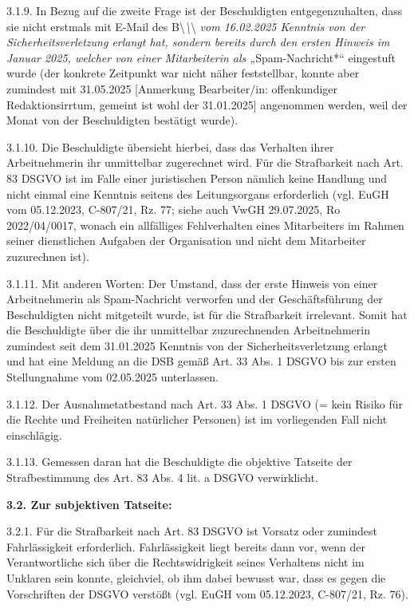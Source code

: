 \documentclass[11pt,a4paper]{article}
\begin{document}
3.1.9. In Bezug auf die zweite Frage ist der Beschuldigten entgegenzuhalten, dass sie nicht erstmals mit E-Mail des B\textbackslash{}\textit{\textbackslash{}}\textbackslash{}\textit{ vom 16.02.2025 Kenntnis von der Sicherheitsverletzung erlangt hat, sondern bereits durch den ersten Hinweis im Januar 2025, welcher von einer Mitarbeiterin als „}Spam-Nachricht*“ eingestuft wurde (der konkrete Zeitpunkt war nicht näher feststellbar, konnte aber zumindest mit 31.05.2025 [Anmerkung Bearbeiter/in: offenkundiger Redaktionsirrtum, gemeint ist wohl der 31.01.2025] angenommen werden, weil der Monat von der Beschuldigten bestätigt wurde).

3.1.10. Die Beschuldigte übersieht hierbei, dass das Verhalten ihrer Arbeitnehmerin ihr unmittelbar zugerechnet wird. Für die Strafbarkeit nach Art. 83 DSGVO ist im Falle einer juristischen Person nämlich keine Handlung und nicht einmal eine Kenntnis seitens des Leitungsorgans erforderlich (vgl. EuGH vom 05.12.2023, C-807/21, Rz. 77; siehe auch VwGH 29.07.2025, Ro 2022/04/0017, wonach ein allfälliges Fehlverhalten eines Mitarbeiters im Rahmen seiner dienstlichen Aufgaben der Organisation und nicht dem Mitarbeiter zuzurechnen ist).

3.1.11. Mit anderen Worten: Der Umstand, dass der erste Hinweis von einer Arbeitnehmerin als Spam-Nachricht verworfen und der Geschäftsführung der Beschuldigten nicht mitgeteilt wurde, ist für die Strafbarkeit irrelevant. Somit hat die Beschuldigte über die ihr unmittelbar zuzurechnenden Arbeitnehmerin zumindest seit dem 31.01.2025 Kenntnis von der Sicherheitsverletzung erlangt und hat eine Meldung an die DSB gemäß Art. 33 Abs. 1 DSGVO bis zur ersten Stellungnahme vom 02.05.2025 unterlassen.

3.1.12. Der Ausnahmetatbestand nach Art. 33 Abs. 1 DSGVO (= kein Risiko für die Rechte und Freiheiten natürlicher Personen) ist im vorliegenden Fall nicht einschlägig.

3.1.13. Gemessen daran hat die Beschuldigte die objektive Tatseite der Strafbestimmung des Art. 83 Abs. 4 lit. a DSGVO verwirklicht.

\textbf{3.2. Zur subjektiven Tatseite:}

3.2.1. Für die Strafbarkeit nach Art. 83 DSGVO ist Vorsatz oder zumindest Fahrlässigkeit erforderlich. Fahrlässigkeit liegt bereits dann vor, wenn der Verantwortliche sich über die Rechtswidrigkeit seines Verhaltens nicht im Unklaren sein konnte, gleichviel, ob ihm dabei bewusst war, dass es gegen die Vorschriften der DSGVO verstößt (vgl. EuGH vom 05.12.2023, C-807/21, Rz. 76).
\end{document}
